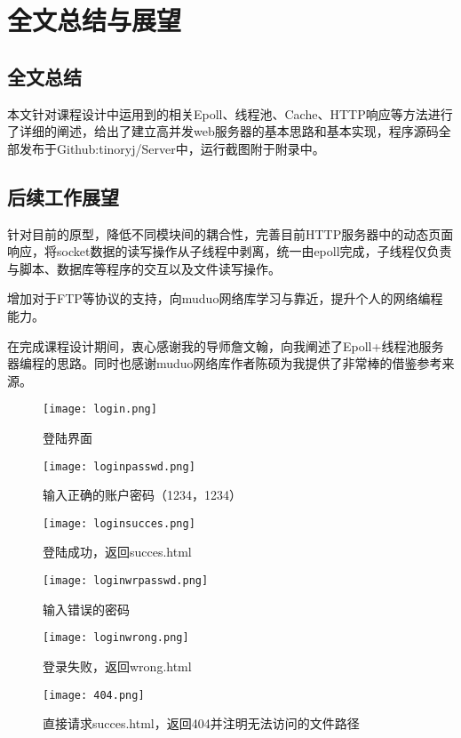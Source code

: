 \documentclass[bachelor]{thesis-uestc}
\begin{document}
\chapter{全文总结与展望}

\section{全文总结}
本文针对课程设计中运用到的相关Epoll、线程池、Cache、HTTP响应等方法进行了详细的阐述，给出了建立高并发web服务器的基本思路和基本实现，程序源码全部发布于Github:tinoryj/Server中，运行截图附于附录中。


\section{后续工作展望}

针对目前的原型，降低不同模块间的耦合性，完善目前HTTP服务器中的动态页面响应，将socket数据的读写操作从子线程中剥离，统一由epoll完成，子线程仅负责与脚本、数据库等程序的交互以及文件读写操作。

 增加对于FTP等协议的支持，向muduo网络库学习与靠近，提升个人的网络编程能力。

\thesisacknowledgement

在完成课程设计期间，衷心感谢我的导师詹文翰，向我阐述了Epoll+线程池服务器编程的思路。同时也感谢muduo网络库作者陈硕为我提供了非常棒的借鉴参考来源。



\thesisappendix
\begin{figure}[h]
\texttt{[image: login.png]}	
\caption{登陆界面}
\label{f1} 
\end{figure}
\begin{figure}[h]
\texttt{[image: loginpasswd.png]}	
\caption{输入正确的账户密码（1234，1234）}
\label{f2} 
\end{figure}
\begin{figure}[h]
\texttt{[image: loginsucces.png]}	
\caption{登陆成功，返回succes.html}
\label{f3} 
\end{figure}
\begin{figure}[h]
\texttt{[image: loginwrpasswd.png]}	
\caption{输入错误的密码}
\label{f4} 
\end{figure}
\begin{figure}[h]
\texttt{[image: loginwrong.png]}	
\caption{登录失败，返回wrong.html}
\label{f5} 
\end{figure}
\begin{figure}[h]
\texttt{[image: 404.png]}	
\caption{直接请求succes.html，返回404并注明无法访问的文件路径}
\label{f6} 
\end{figure}
\end{document}
